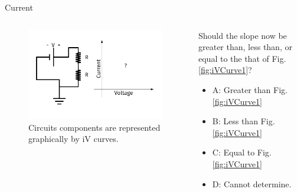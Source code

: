 \documentclass{beamer}
\begin{document}
\begin{frame}{Current}
\begin{columns}[T]
\begin{column}{0.5\textwidth}
\begin{figure}
\centering
\includegraphics[width=\textwidth,trim=0.5cm 0cm 1cm 0cm,clip=true]{figures/iVCurve2.pdf}
\caption{\label{fig:iVCurve2} Circuits components are represented graphically by iV curves.}
\end{figure}
\end{column}
\begin{column}{0.5\textwidth}
\small
Should the slope now be greater than, less than, or equal to the that of Fig. \ref{fig:iVCurve1}?
\begin{itemize}
\item A: Greater than Fig. \ref{fig:iVCurve1}
\item B: Less than Fig. \ref{fig:iVCurve1}
\item C: Equal to Fig. \ref{fig:iVCurve1}
\item D: Cannot determine.
\end{itemize}
\end{column}
\end{columns}
\end{frame}
\end{document}
